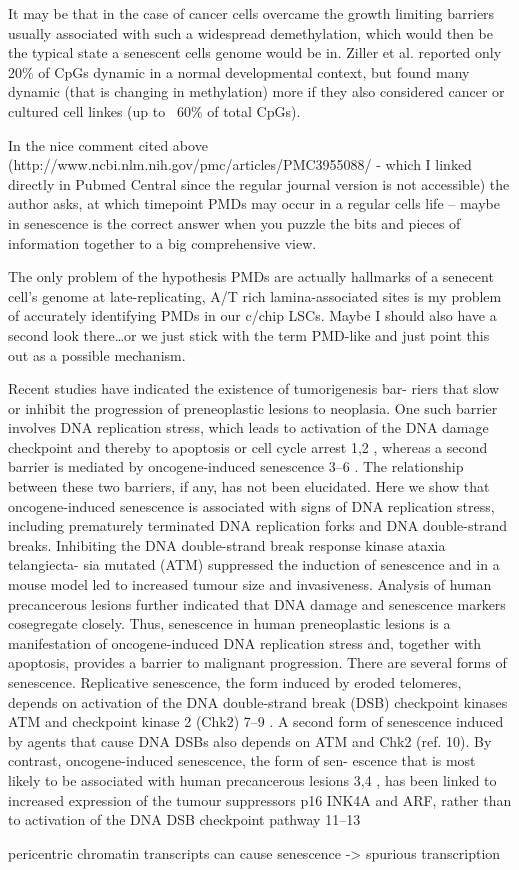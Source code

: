 It may be that in the case of cancer cells overcame the growth limiting barriers usually associated with such a widespread demethylation, which would then be the typical state a senescent cells genome would be in. Ziller et al. reported only 20\% of CpGs dynamic in a normal developmental context, but found many dynamic (that is changing in methylation) more if they also considered cancer or cultured cell linkes (up to ~60\% of total CpGs).

In the nice comment cited above (http://www.ncbi.nlm.nih.gov/pmc/articles/PMC3955088/ - which I linked directly in Pubmed Central since the regular journal version is not accessible) the author asks, at which timepoint PMDs may occur in a regular cells life – maybe in senescence is the correct answer when you puzzle the bits and pieces of information together to a big comprehensive view.

The only problem of the hypothesis PMDs are actually hallmarks of a senecent cell’s genome at late-replicating, A/T rich lamina-associated sites is my problem of accurately identifying PMDs in our c/chip LSCs. Maybe I should also have a second look there…or we just stick with the term PMD-like and just point this out as a possible mechanism. 


Recent studies have indicated the existence of tumorigenesis bar-
riers that slow or inhibit the progression of preneoplastic lesions
to neoplasia. One such barrier involves DNA replication stress,
which leads to activation of the DNA damage checkpoint and
thereby to apoptosis or cell cycle arrest 1,2 , whereas a second barrier
is mediated by oncogene-induced senescence 3–6 . The relationship
between these two barriers, if any, has not been elucidated. Here
we show that oncogene-induced senescence is associated with
signs of DNA replication stress, including prematurely terminated
DNA replication forks and DNA double-strand breaks. Inhibiting
the DNA double-strand break response kinase ataxia telangiecta-
sia mutated (ATM) suppressed the induction of senescence and in
a mouse model led to increased tumour size and invasiveness.
Analysis of human precancerous lesions further indicated that
DNA damage and senescence markers cosegregate closely. Thus,
senescence in human preneoplastic lesions is a manifestation of
oncogene-induced DNA replication stress and, together with
apoptosis, provides a barrier to malignant progression.
There are several forms of senescence. Replicative senescence, the
form induced by eroded telomeres, depends on activation of the
DNA double-strand break (DSB) checkpoint kinases ATM and
checkpoint kinase 2 (Chk2) 7–9 . A second form of senescence induced
by agents that cause DNA DSBs also depends on ATM and Chk2 (ref.
10). By contrast, oncogene-induced senescence, the form of sen-
escence that is most likely to be associated with human precancerous
lesions 3,4 , has been linked to increased expression of the tumour
suppressors p16 INK4A and ARF, rather than to activation of the
DNA DSB checkpoint pathway 11–13\cite{Bartkova2006}

pericentric chromatin transcripts can cause senescence -> spurious transcription\cite{Tasselli2016}